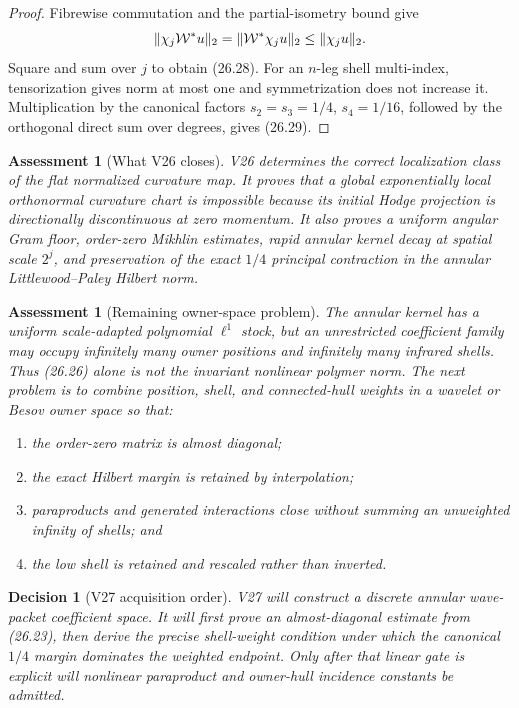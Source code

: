 \documentclass[11pt,oneside]{book}
\newtheorem{assessment}[theorem]{Assessment}
\newtheorem{decision}[theorem]{Decision}
\theoremstyle{definition}
\theoremstyle{remark}
\begin{document}
\begin{proof}
Fibrewise commutation and the partial-isometry bound give
\[
 \|\chi_j{\cal W}^*u\|_2
 =\|{\cal W}^*\chi_ju\|_2\leq\|\chi_ju\|_2.
\]
Square and sum over \(j\) to obtain (26.28).  For an \(n\)-leg shell
multi-index, tensorization gives norm at most one and symmetrization
does not increase it.  Multiplication by the canonical factors
\(s_2=s_3=1/4\), \(s_4=1/16\), followed by the orthogonal direct sum
over degrees, gives (26.29).
\end{proof}

\begin{assessment}[What V26 closes]
\label{ass:e8v26-closes}
V26 determines the correct localization class of the flat normalized
curvature map.  It proves that a global exponentially local
orthonormal curvature chart is impossible because its initial Hodge
projection is directionally discontinuous at zero momentum.  It also
proves a uniform angular Gram floor, order-zero Mikhlin estimates,
rapid annular kernel decay at spatial scale \(2^j\), and preservation
of the exact \(1/4\) principal contraction in the annular
Littlewood--Paley Hilbert norm.
\end{assessment}

\begin{assessment}[Remaining owner-space problem]
\label{ass:e8v26-remains}
The annular kernel has a uniform scale-adapted polynomial
\(\ell^1\) stock, but an unrestricted coefficient family may occupy
infinitely many owner positions and infinitely many infrared shells.
Thus (26.26) alone is not the invariant nonlinear polymer norm.
The next problem is to combine position, shell, and connected-hull
weights in a wavelet or Besov owner space so that:
\begin{enumerate}
\item the order-zero matrix is almost diagonal;
\item the exact Hilbert margin is retained by interpolation;
\item paraproducts and generated interactions close without summing
an unweighted infinity of shells; and
\item the low shell is retained and rescaled rather than inverted.
\end{enumerate}
\end{assessment}

\begin{decision}[V27 acquisition order]
\label{dec:e8v26-v27}
V27 will construct a discrete annular wave-packet coefficient space.
It will first prove an almost-diagonal estimate from (26.23), then
derive the precise shell-weight condition under which the canonical
\(1/4\) margin dominates the weighted endpoint.  Only after that
linear gate is explicit will nonlinear paraproduct and owner-hull
incidence constants be admitted.
\end{decision}
\end{document}
